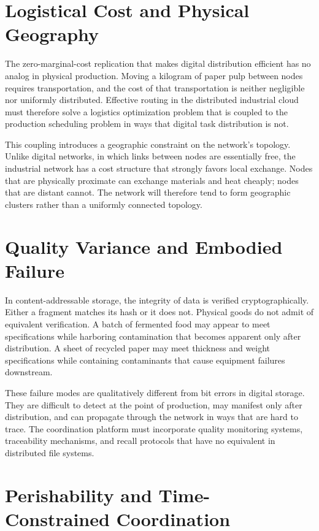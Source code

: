 \documentclass[12pt]{book}
\theoremstyle{definition}
\theoremstyle{remark}
\begin{document}
\section{Logistical Cost and Physical Geography}

The zero-marginal-cost replication that makes digital distribution
efficient has no analog in physical production. Moving a kilogram of
paper pulp between nodes requires transportation, and the cost of
that transportation is neither negligible nor uniformly distributed.
Effective routing in the distributed industrial cloud must therefore
solve a logistics optimization problem that is coupled to the
production scheduling problem in ways that digital task distribution
is not.

This coupling introduces a geographic constraint on the network's
topology. Unlike digital networks, in which links between nodes are
essentially free, the industrial network has a cost structure that
strongly favors local exchange. Nodes that are physically proximate
can exchange materials and heat cheaply; nodes that are distant cannot.
The network will therefore tend to form geographic clusters rather
than a uniformly connected topology.

\section{Quality Variance and Embodied Failure}

In content-addressable storage, the integrity of data is verified
cryptographically. Either a fragment matches its hash or it does not.
Physical goods do not admit of equivalent verification. A batch of
fermented food may appear to meet specifications while harboring
contamination that becomes apparent only after distribution. A sheet
of recycled paper may meet thickness and weight specifications while
containing contaminants that cause equipment failures downstream.

These failure modes are qualitatively different from bit errors in
digital storage. They are difficult to detect at the point of
production, may manifest only after distribution, and can propagate
through the network in ways that are hard to trace. The coordination
platform must incorporate quality monitoring systems, traceability
mechanisms, and recall protocols that have no equivalent in
distributed file systems.

\section{Perishability and Time-Constrained Coordination}
\end{document}
